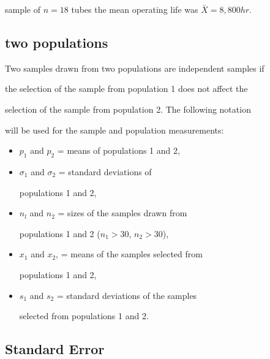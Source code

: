 sample of $n = 18$ tubes the mean operating life was $\bar{X}=

8,800 hr.$

 



\subsection{two populations}

 

Two samples drawn from two populations are independent samples if

the selection of the sample from population 1 does not affect the

selection of the sample from population 2. The following notation

will be used for the sample and population measurements:

 

\begin{itemize}

\item $p_1$ and $p_2$ = means of populations 1 and 2,

 

\item $\sigma_1$ and $\sigma_2$ = standard deviations of

populations 1 and 2,

 

\item $n_l$ and $n_2$ = sizes of the samples drawn from

populations 1 and 2 ($n_1 >30 $, $n_2 >30 $),

 

\item $x_1$ and $x_2$, = means of the samples selected from

populations 1 and 2,

 

\item $s_{1}$ and $s_{2}$ = standard deviations of the samples

selected from populations 1 and 2.

 

\end{itemize}

\newpage

 



\subsection{Standard Error}

